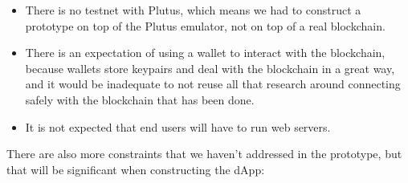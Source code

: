 \documentclass{article}
\begin{document}
\begin{itemize}
  \item There is no testnet with Plutus, which means we had to construct a prototype on top of the Plutus emulator, not on top of a real blockchain.
  \item There is an expectation of using a wallet to interact with the blockchain, because wallets store keypairs and deal with the blockchain in a great way, and it would be inadequate to not reuse all that research around connecting safely with the blockchain that has been done.
  \item It is not expected that end users will have to run web servers.
\end{itemize}

There are also more constraints that we haven't addressed in the prototype, but that will be significant when constructing the dApp:
\end{document}
